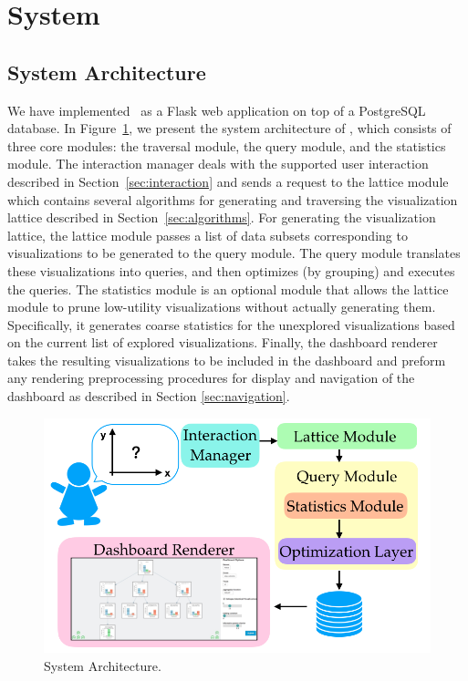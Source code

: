 \section{System\label{sec:system}}
\subsection{System Architecture}
We have implemented \system\ as a Flask web application on top of a PostgreSQL database. In Figure~\ref{system_architecture}, we present the system architecture of \system, which consists of three core modules: the traversal module, the query module, and the statistics module. The interaction manager deals with the supported user interaction described in Section~\ref{sec:interaction} and sends a request to the lattice module which  contains several algorithms for generating and traversing the visualization lattice described in Section~\ref{sec:algorithms}. For generating the visualization lattice, the lattice module passes a list of data subsets corresponding to visualizations to be generated to the query module. The query module translates these visualizations into queries, and then optimizes (by grouping) and executes the queries. The statistics module is an optional module that allows the lattice module to prune low-utility visualizations without actually generating them. Specifically, it generates coarse statistics for the unexplored visualizations based on the current list of explored visualizations. Finally, the dashboard renderer takes the resulting visualizations to be included in the dashboard and preform any rendering preprocessing procedures for display and navigation of the dashboard as described in Section \ref{sec:navigation}.
\begin{figure}[ht!]
\centering
\includegraphics[width=\linewidth]{figures/system_architecture.png}
\caption{System Architecture.}%
\label{system_architecture}
\end{figure}

